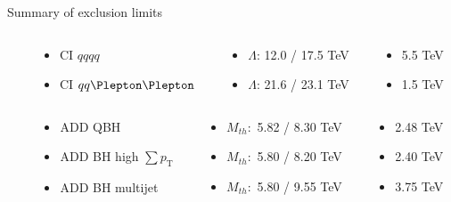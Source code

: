 \documentclass[8pt]{beamer}
\begin{document}
\begin{frame}{\large Summary of exclusion limits}
  \begin{columns}
  \begin{column}{3cm}
  \end{column}
  \begin{column}{3cm}
    \begin{itemize}
     \item[\XSolid] CI $qqqq$
     \item[\XSolid] CI $qq\Plepton\Plepton$
    \end{itemize}
  \end{column}
  \begin{column}{3.3cm}
    \begin{itemize}
     \item[] $\Lambda$: 12.0 / 17.5 TeV
     \item[] $\Lambda$: 21.6 / 23.1 TeV
    \end{itemize}
  \end{column}
  \begin{column}{2.7cm}
    \begin{itemize}
     \item[] 5.5 TeV
     \item[] 1.5 TeV
    \end{itemize}
  \end{column}
 \end{columns}
 
 \vspace{0.2cm}
 
 \begin{columns}
  \begin{column}{3cm}
  \end{column}
  \begin{column}{3cm}
    \begin{itemize}
     \item[\EightStarBold] ADD QBH
     \item[\EightStarBold] ADD BH high $\sum p_\mathrm{T}$
     \item[\EightStarBold] ADD BH multijet
    \end{itemize}
  \end{column}
  \begin{column}{3.3cm}
    \begin{itemize}
     \item[] $M_{th}:$ 5.82 / 8.30 TeV
     \item[] $M_{th}:$ 5.80 / 8.20 TeV
     \item[] $M_{th}:$ 5.80 / 9.55 TeV
    \end{itemize}
  \end{column}
  \begin{column}{2.7cm}
    \begin{itemize}
     \item[] 2.48 TeV
     \item[] 2.40 TeV
     \item[] 3.75 TeV
    \end{itemize}
  \end{column}
 \end{columns}


\end{frame}
\end{document}

